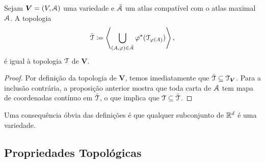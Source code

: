 \begin{prop}
Sejam $\bm V=(V,\mathcal{A})$ uma variedade e $\bar{\mathcal{A}}$ um atlas compatível com o atlas maximal $\mathcal{A}$. A topologia
	\begin{equation*}
	\bar{\mathcal{T}} \coloneqq \left\langle \bigcup_{(A,\varphi) \in \bar{\mathcal{A}}} \varphi^\star(\mathcal{T}_{\varphi(A)}) \right\rangle,
	\end{equation*}
é igual à topologia $\mathcal{T}$ de $\bm V$.
\end{prop}
\begin{proof}
Por definição da topologia de $\bm V$, temos imediatamente que $\bar{\mathcal{T}} \subseteq \mathcal{T}_{\bm V}$. Para a inclusão contrária, a proposição anterior mostra que toda carta de $\mathcal{A}$ tem mapa de coordenadas contínuo em $\bar{\mathcal{T}}$, o que implica que $\mathcal{T} \subseteq \bar{\mathcal{T}}$.
\end{proof}

Uma consequência óbvia das definições é que qualquer subconjunto de $\mathbb{R}^d$ é uma variedade.

\subsection{Propriedades Topológicas}

